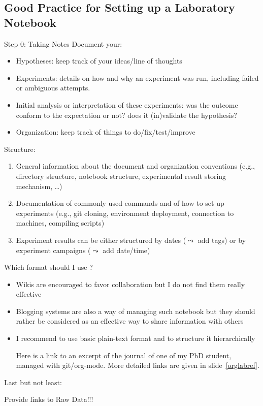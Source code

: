 \documentclass[xcolor=x11names,compress,8pt]{beamer}
\renewcommand{\(}{\begin{columns}}
\renewcommand{\)}{\end{columns}}
\newcommand{\<}[1]{\begin{column}{#1}}
\renewcommand{\>}{\end{column}}
\begin{document}
\subsection{Good Practice for Setting up a Laboratory Notebook}
\label{sec-3-2}
\begin{frame}[label=sec-3-2-1]{Step 0: Taking Notes}
\alert{Document} your:
\begin{itemize}
\item \alert{Hypotheses}: keep track of your ideas/line of thoughts
\item \alert{Experiments}: details on how and why an experiment was run, including
failed or ambiguous attempts.
\item \alert{Initial analysis or interpretation} of these experiments: was the
outcome conform to the expectation or not? does it (in)validate the
hypothesis?
\item \alert{Organization}: keep track of things to do/fix/test/improve
\end{itemize}

\alert{Structure}:
\begin{enumerate}
\item General information about the document and organization \alert{conventions}
(e.g., directory structure, notebook structure, experimental result
storing mechanism, \ldots{})
\item Documentation of \alert{commonly used commands} and of how to set up
experiments (e.g., git cloning, environment deployment, connection
to machines, compiling scripts)
\item Experiment results can be either structured \alert{by dates} ($\leadsto$ add
tags) or \alert{by experiment campaigns} ($\leadsto$ add date/time)
\end{enumerate}
\end{frame}
\begin{frame}[label=sec-3-2-2]{Which format should I use ?}
\begin{itemize}
\item \alert{Wikis} are encouraged to favor collaboration but I do not find them
really effective
\item \alert{Blogging} systems are also a way of managing such notebook but they
should rather be considered as an effective way to share information
with others
\item I recommend to use basic \alert{plain-text} format and to \alert{structure it
hierarchically}
\begin{center}
Here is a \alert{\href{http://starpu-simgrid.gforge.inria.fr/misc/LabBook.html\#sec-8-1}{link}} to an excerpt of the journal of one of my PhD
student, managed with git/org-mode. More detailed links are given in
slide~\ref{orglabref}.
\end{center}
\end{itemize}

Last but not least:
\begin{center}
Provide links to \alert{Raw Data}!!!
\end{center}
\end{frame}
\end{document}
